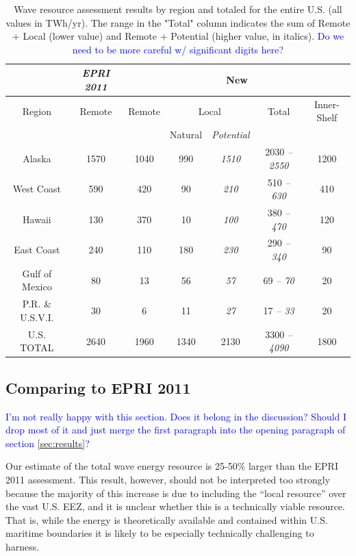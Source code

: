 \begin{table}[ht]
  \centering
  \begin{tabular}{|c|c|c|c|c|c|c|}
    \cline{2-7}
    \multicolumn{1}{c|}{} & {\it EPRI 2011} & \multicolumn{5}{c|}{New} \\
    \hline
    Region & Remote  & Remote & \multicolumn{2}{c|}{Local} & Total & Inner-Shelf\\
    & & & Natural & {\it Potential} & & \\
    \hline
    Alaska & 1570 & 1040 & 990 & {\it 1510} & 2030 {\it – 2550} & 1200 \\
    West Coast & 590 & 420 & 90 & {\it 210} & 510 {\it – 630} & 410 \\
    Hawaii & 130 & 370 & 10 & {\it 100} & 380 {\it – 470} & 120 \\
    East Coast & 240 & 110 & 180 & {\it 230} & 290 {\it – 340} & 90 \\
    Gulf of Mexico & 80 & 13 & 56 & {\it 57} & 69 {\it – 70} & 20 \\
    P.R. \& U.S.V.I. & 30 & 6 & 11 & {\it 27} & 17 {\it – 33} & 20 \\
    \hline \hline
U.S. TOTAL & 2640 & 1960 & 1340 & 2130 & 3300 {\it – 4090} & 1800 \\
\hline
  \end{tabular}
  \caption{Wave resource assessment results by region and totaled for the entire U.S. (all values in TWh/yr). The range in the "Total" column indicates the sum of Remote + Local (lower value) and Remote + Potential (higher value, in italics). \textcolor{blue}{Do we need to be more careful w/ significant digits here?}}
  \label{table:totals}
\end{table}

\subsection{Comparing to EPRI 2011}
\textcolor{blue}{I'm not really happy with this section. Does it belong in the discussion? Should I drop most of it and just merge the first paragraph into the opening paragraph of section \ref{sec:results}?}

Our estimate of the total wave energy resource is 25-50\% larger than the EPRI 2011 assessment. This result, however, should not be interpreted too strongly because the majority of this increase is due to including the ``local resource'' over the vast U.S. EEZ, and it is unclear whether this is a technically viable resource. That is, while the energy is theoretically available and contained within U.S. maritime boundaries it is likely to be especially technically challenging to harness.

